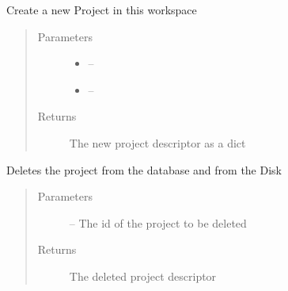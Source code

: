 \documentclass[letterpaper,10pt,english]{sphinxmanual}
\begin{document}
\begin{fulllineitems}
\label{_source/son_editor.impl:son_editor.impl.projectsimpl.create_project}
Create a new Project in this workspace
\begin{quote}\begin{description}
\item[{Parameters}] \leavevmode\begin{itemize}
\item {} 
 -- 

\item {} 
 -- 

\end{itemize}

\item[{Returns}] \leavevmode
The new project descriptor as a dict

\end{description}\end{quote}

\end{fulllineitems}


\begin{fulllineitems}
\label{_source/son_editor.impl:son_editor.impl.projectsimpl.delete_project}
Deletes the project from the database and from the Disk
\begin{quote}\begin{description}
\item[{Parameters}] \leavevmode
{} -- The id of the project to be deleted

\item[{Returns}] \leavevmode
The deleted project descriptor

\end{description}\end{quote}

\end{fulllineitems}

\end{document}
